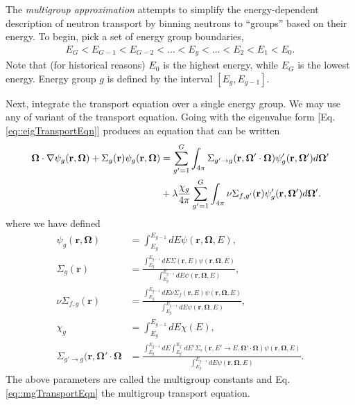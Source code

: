 \documentclass[11pt]{article}
\renewcommand\vec{\mathbf}
\begin{document}
The \emph{multigroup approximation} attempts to simplify the energy-dependent description of neutron transport by binning neutrons to ``groups'' based on their energy.  To begin, pick a set of energy group boundaries, 
\begin{align}
  E_G < E_{G-1} < E_{G-2} < \hdots < E_g < \hdots < E_2 < E_1 < E_0.
\end{align}
Note that (for historical reasons) \(E_0\) is the highest energy, while \(E_G\) is the lowest energy.  Energy group \(g\) is defined by the interval \([E_g, E_{g-1}]\).  

Next, integrate the transport equation over a single energy group.  We may use any of variant of the transport equation.  Going with the eigenvalue form [Eq. \eqref{eq::eigTransportEqn}] produces an equation that can be written
\begin{align}
  \vec{\Omega} \cdot \nabla \psi_g(\vec{r},\vec{\Omega})
  + \Sigma_g(\vec{r}) \psi_g(\vec{r},\vec{\Omega})
  &= \sum_{g'=1}^G \int_{4\pi} \Sigma_{g'\rightarrow g}(\vec{r}, \vec{\Omega}'\cdot\vec{\Omega}) \psi_g'(\vec{r},\vec{\Omega}') d\vec{\Omega}' \notag\\
  &+ \lambda\frac{\chi_g}{4\pi} \sum_{g'=1}^G \int_{4\pi} \nu\Sigma_{f,g'}(\vec{r}) \psi_g'(\vec{r},\vec{\Omega}') d\vec{\Omega}'.
  \label{eq::mgTransportEqn}
\end{align}
where we have defined
\begin{align}
  \psi_g(\vec{r},\vec{\Omega}) &= \int_{E_g}^{E_{g-1}} dE \psi(\vec{r},\vec{\Omega},E), \\
  \Sigma_g(\vec{r}) &= \frac{\int_{E_g}^{E_{g-1}} dE \Sigma(\vec{r},E) \psi(\vec{r},\vec{\Omega},E)}{\int_{E_g}^{E_{g-1}} dE \psi(\vec{r},\vec{\Omega},E)}, \\
  \nu\Sigma_{f,g}(\vec{r}) &= \frac{\int_{E_g}^{E_{g-1}} dE \nu\Sigma_f(\vec{r},E) \psi(\vec{r},\vec{\Omega},E)}{\int_{E_g}^{E_{g-1}} dE \psi(\vec{r},\vec{\Omega},E)}, \\
  \chi_g &=  \int_{E_g}^{E_{g-1}} dE \chi(E), \\
  \Sigma_{g'\rightarrow g}(\vec{r}, \vec{\Omega}'\cdot\vec{\Omega} &= 
    \frac{\int_{E_g}^{E_{g-1}} dE \int_{E_{g'}}^{E_{g'}} dE' \Sigma_s(\vec{r},E' \rightarrow E, \vec{\Omega}'\cdot\vec{\Omega}) \psi(\vec{r},\vec{\Omega},E)}{\int_{E_g}^{E_{g-1}} dE \psi(\vec{r},\vec{\Omega},E)}.
\end{align}
The above parameters are called the multigroup constants and Eq. \eqref{eq::mgTransportEqn} the multigroup transport equation.  
\end{document}
